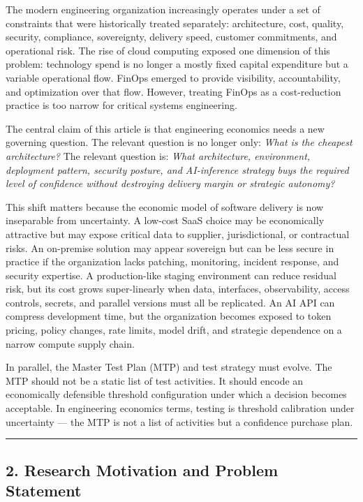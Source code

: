 \documentclass[
]{article}
\begin{document}
The modern engineering organization increasingly operates under a set of
constraints that were historically treated separately: architecture,
cost, quality, security, compliance, sovereignty, delivery speed,
customer commitments, and operational risk. The rise of cloud computing
exposed one dimension of this problem: technology spend is no longer a
mostly fixed capital expenditure but a variable operational flow. FinOps
emerged to provide visibility, accountability, and optimization over
that flow. However, treating FinOps as a cost-reduction practice is too
narrow for critical systems engineering.

The central claim of this article is that engineering economics needs a
new governing question. The relevant question is no longer only:
\emph{What is the cheapest architecture?} The relevant question is:
\emph{What architecture, environment, deployment pattern, security
posture, and AI-inference strategy buys the required level of confidence
without destroying delivery margin or strategic autonomy?}

This shift matters because the economic model of software delivery is
now inseparable from uncertainty. A low-cost SaaS choice may be
economically attractive but may expose critical data to supplier,
jurisdictional, or contractual risks. An on-premise solution may appear
sovereign but can be less secure in practice if the organization lacks
patching, monitoring, incident response, and security expertise. A
production-like staging environment can reduce residual risk, but its
cost grows super-linearly when data, interfaces, observability, access
controls, secrets, and parallel versions must all be replicated. An AI
API can compress development time, but the organization becomes exposed
to token pricing, policy changes, rate limits, model drift, and
strategic dependence on a narrow compute supply chain.

In parallel, the Master Test Plan (MTP) and test strategy must evolve.
The MTP should not be a static list of test activities. It should encode
an economically defensible threshold configuration under which a
decision becomes acceptable. In engineering economics terms, testing is
threshold calibration under uncertainty --- the MTP is not a list of
activities but a confidence purchase plan.

\begin{center}\rule{0.5\linewidth}{0.5pt}\end{center}

\subsection{2. Research Motivation and Problem
Statement}\label{research-motivation-and-problem-statement}
\end{document}

